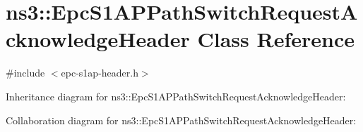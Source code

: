 \hypertarget{classns3_1_1EpcS1APPathSwitchRequestAcknowledgeHeader}{}\section{ns3\+:\+:Epc\+S1\+A\+P\+Path\+Switch\+Request\+Acknowledge\+Header Class Reference}
\label{classns3_1_1EpcS1APPathSwitchRequestAcknowledgeHeader}


{\ttfamily \#include $<$epc-\/s1ap-\/header.\+h$>$}



Inheritance diagram for ns3\+:\+:Epc\+S1\+A\+P\+Path\+Switch\+Request\+Acknowledge\+Header\+:


Collaboration diagram for ns3\+:\+:Epc\+S1\+A\+P\+Path\+Switch\+Request\+Acknowledge\+Header\+:
